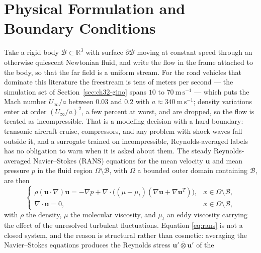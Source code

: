 \section{Physical Formulation and Boundary Conditions}
\label{sec:ch32-formulation}

Take a rigid body $\mathcal{B} \subset \mathbb{R}^3$ with surface $\partial\mathcal{B}$ moving
at constant speed through an otherwise quiescent Newtonian fluid, and write the flow in the
frame attached to the body, so that the far field is a uniform stream. For the road vehicles that
dominate this literature the freestream is tens of meters per second --- the simulation set of
Section~\ref{sec:ch32-gino} spans $10$ to $70\ \mathrm{m\,s^{-1}}$ --- which puts the Mach number
$U_\infty/a$ between $0.03$ and $0.2$ with $a \approx 340\ \mathrm{m\,s^{-1}}$; density variations
enter at order $(U_\infty/a)^2$, a few percent at worst, and are dropped, so the flow is treated as
incompressible. That is a modeling decision with a hard boundary: transonic aircraft cruise,
compressors, and any problem with shock waves fall outside it, and a surrogate trained on
incompressible, Reynolds-averaged labels has no obligation to warn when it is asked about them.
The steady Reynolds-averaged Navier--Stokes (RANS) equations for the mean velocity
$\mathbf{u}$ and mean pressure $p$ in the fluid region $\Omega \setminus \mathcal{B}$, with
$\Omega$ a bounded outer domain containing $\mathcal{B}$, are then
\begin{equation}
  \label{eq:rans}
  \begin{cases}
    \rho (\mathbf{u} \cdot \nabla) \mathbf{u} = -\nabla p + \nabla \cdot \big( (\mu + \mu_t) (\nabla \mathbf{u} + \nabla \mathbf{u}^T) \big), & x \in \Omega \setminus \mathcal{B}, \\
    \nabla \cdot \mathbf{u} = 0, & x \in \Omega \setminus \mathcal{B},
  \end{cases}
\end{equation}
with $\rho$ the density, $\mu$ the molecular viscosity, and $\mu_t$ an eddy viscosity carrying
the effect of the unresolved turbulent fluctuations. Equation \eqref{eq:rans} is not a closed
system, and the reason is structural rather than cosmetic: averaging the Navier--Stokes
equations produces the Reynolds stress $\overline{\mathbf{u}' \otimes \mathbf{u}'}$ of the
